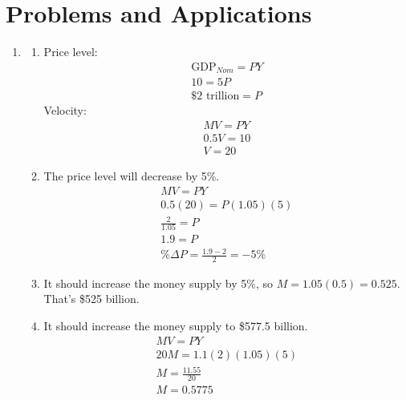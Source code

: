 \documentclass{article}
\begin{document}
\section*{Problems and Applications}

\begin{enumerate}

\item

	\begin{enumerate}
	
	\item Price level:
		\begin{gather*}
		\text{GDP}_{Nom} = PY \\
		10 = 5P \\
		\$2 \text{ trillion} = P
		\end{gather*}
		Velocity:
		\begin{gather*}
		MV = PY \\
		0.5V = 10 \\
		V = 20
		\end{gather*}
		
	\item The price level will decrease by 5\%.
		\begin{gather*}
		MV = PY \\
		0.5(20) = P(1.05)(5) \\
		\frac{2}{1.05} = P \\
		1.9 = P \\
		\% \Delta P = \frac{1.9 - 2}{2} = -5\%
		\end{gather*}
		
	\item It should increase the money supply by 5\%, so $M = 1.05(0.5) = 0.525$. That's \$525 billion.
	
	\item It should increase the money supply to \$577.5 billion. 
		\begin{gather*}
		MV = PY \\
		20M = 1.1(2)(1.05)(5) \\
		M = \frac{11.55}{20} \\
		M = 0.5775
		\end{gather*}
		
	\end{enumerate}

\end{enumerate}
\end{document}

